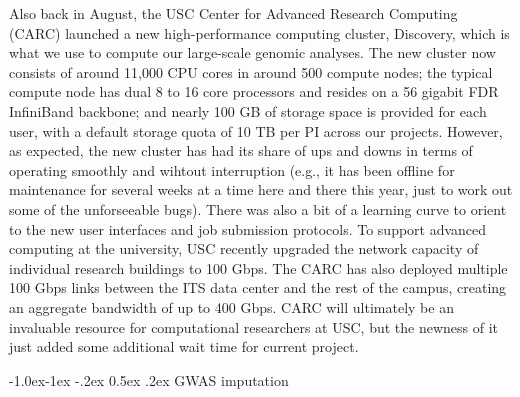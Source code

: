 \documentclass[11pt,]{article}
\makeatletter
\renewcommand\subsubsection{
  \@startsection{subsubsection}{3}{\z@}
    {-1.0ex\@plus -1ex \@minus -.2ex}%
    {0.5ex \@plus .2ex}%
    {\normalfont\normalsize\bf}} %
\makeatother
\begin{document}
Also back in August, the USC Center for Advanced Research Computing (CARC) launched a new high-performance computing cluster, Discovery, which is what we use to compute our large-scale genomic analyses.
The new cluster now consists of around 11,000 CPU cores in around 500 compute nodes; the typical compute node has dual 8 to 16 core processors and resides on a 56 gigabit FDR InfiniBand backbone; and nearly 100 GB of storage space is provided for each user, with a default storage quota of 10 TB per PI across our projects.
However, as expected, the new cluster has had its share of ups and downs in terms of operating smoothly and wihtout interruption (e.g., it has been offline for maintenance for several weeks at a time here and there this year, just to work out some of the unforseeable bugs).
There was also a bit of a learning curve to orient to the new user interfaces and job submission protocols.
To support advanced computing at the university, USC recently upgraded the network capacity of individual research buildings to 100 Gbps.
The CARC has also deployed multiple 100 Gbps links between the ITS data center and the rest of the campus, creating an aggregate bandwidth of up to 400 Gbps.
CARC will ultimately be an invaluable resource for computational researchers at USC, but the newness of it just added some additional wait time for current project.

\hypertarget{gwas-imputation}{%
\subsubsection{GWAS imputation}\label{gwas-imputation}}
\end{document}
